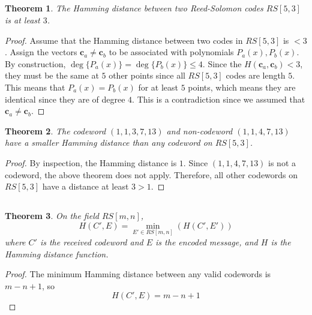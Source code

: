 \documentclass{article}
\newtheorem{theorem}{Theorem}
\begin{document}
\subsection{}

\begin{theorem}
    The Hamming distance between two Reed-Solomon codes \(RS[5, 3]\) is at least \(3\).
\end{theorem}
\begin{proof}
    Assume that the Hamming distance between two codes in \(RS[5, 3]\) is \(< 3\).
    Assign the vectors \(\bm{c}_a \neq \bm{c}_b\) to be associated with polynomials \(P_a(x), P_b(x)\).
    By construction, \(\deg\{P_a(x)\} = \deg\{P_b(x)\} \leqslant 4\).
    Since the \(H(\bm{c}_a, \bm{c}_b) < 3\), they must be the same at \(5\) other points since all \(RS[5, 3]\) codes are length \(5\).
    This means that \(P_a(x) = P_b(x)\) for at least \(5\) points, which means they are identical since they are of degree \(4\).
    This is a contradiction since we assumed that \(\bm{c}_a \neq \bm{c}_b\).
\end{proof}

\begin{theorem}
    The codeword \((1, 1, 3, 7, 13)\) and non-codeword \((1, 1, 4, 7, 13)\) have a smaller Hamming distance than any codeword on \(RS[5, 3]\).
\end{theorem}
\begin{proof}
    By inspection, the Hamming distance is \(1\).
    Since \((1, 1, 4, 7, 13)\) is not a codeword, the above theorem does not apply.
    Therefore, all other codewords on \(RS[5, 3]\) have a distance at least \(3 > 1\).
\end{proof}

\subsection{}

\begin{theorem}
    On the field \(RS[m, n]\),
    \begin{equation}
        H(C', E) = \min_{E' \in RS[m, n]} (H(C', E'))
    \end{equation}
    where \(C'\) is the received codeword and \(E\) is the encoded message, and \(H\) is the Hamming distance function.
\end{theorem}
\begin{proof}
    The minimum Hamming distance between any valid codewords is \(m - n + 1\),
    so
    \begin{equation}
        H(C', E) = m - n + 1
    \end{equation}
\end{proof}
\end{document}

